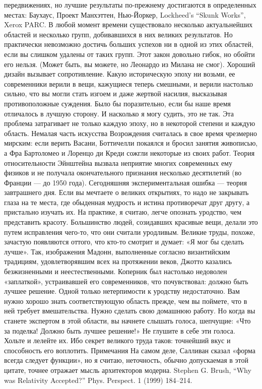 \documentclass[ebook,12pt,oneside,openany]{memoir}
\begin{document}
передвижениях, но лучшие результаты по-прежнему достигаются в
определенных местах: Баухаус, Проект Манхэттен, Нью-Йоркер, Lockheed’s
“Skunk Works”, Xerox PARC. В любой момент времени существовало
несколько актуальнейших областей и несколько групп, добивавшихся в них
великих результатов. Но практически невозможно достичь больших успехов
ни в одной из этих областей, если вы слишком удалены от таких групп.
Этот закон довольно гибок, но обойти его нельзя. (Может быть, вы
можете, но Леонардо из Милана не смог). Хороший дизайн вызывает
сопротивление. Какую историческую эпоху ни возьми, ее современники
верили в вещи, кажущиеся теперь смешными, и верили настолько сильно,
что вы могли стать изгоем и даже жертвой насилия, высказывая
противоположные суждения. Было бы поразительно, если бы наше время
отличалось в лучшую сторону. И насколько я могу судить, это не так.
Эта проблема затрагивает не только каждую эпоху, но в некоторой
степени и каждую область. Немалая часть искусства Возрождения
считалась в свое время чрезмерно мирским: если верить Васани,
Боттичелли покаялся и бросил занятия живописью, а Фра Бартоломео и
Лоренцо ди Креди сожгли некоторые из своих работ. Теория
относительности Эйнштейна вызвала неприятие многих современных ему
физиков и не получала окончательного признания несколько десятилетий
(во Франции — до 1950 года). Сегодняшняя экспериментальная ошибка —
теория завтрашнего дня. Если вы мечтаете о великих открытиях, то надо
не закрывать глаза на те места, где обыденная мудрость и истина
противоречат друг другу, а пристально изучать их. На практике, я
считаю, легче опознать уродство, чем представить красоту. Большинство
людей, созидавших красивые вещи, делали это путем исправления чего-то,
что они считали уродливым. Великие труды, похоже, зачастую появляются
оттого, что кто-то смотрит и думает: «Я мог бы сделать лучше». Так,
изображения Мадонн, выполненные согласно византийским традициям,
удовлетворявшим всех на протяжении веков, Джотто казались
безжизненными и неестественными. Коперник был настолько недоволен
«заплаткой», устраивавшей его современников, что почувствовал: должно
быть лучшее решение. Одной только нетерпимости к уродству
недостаточно. Вам нужно хорошо знать соответствующую область прежде,
чем вы поймете, что в ней требует вмешательства. Нужно сделать свою
домашнюю работу. Но когда вы станете экспертом в этой области, вы
начнете слышать голоса, шепчущие: «Что за поделка! Должно быть лучшее
решение!» Не глушите в себе эти голоса. Хольте и лелейте их. Ибо
секрет великого труда таков: точнейший вкус и способность его
воплотить. Примечания На самом деле, Салливан сказал «форма всегда
следует функции», но я считаю, неточность, обычно допускаемая в этой
цитате, точнее отражает мысль архитекторов модерна. Stephen G. Brush,
“Why was Relativity Accepted?” Phys. Perspect. 1 (1999) 184–214.
\end{document}
